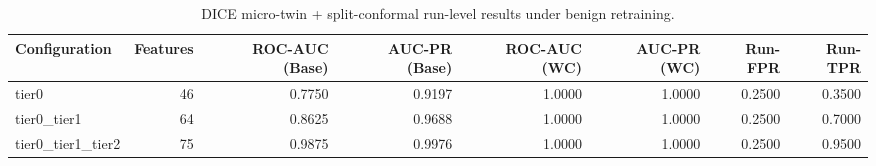 \begin{table}[t]
\centering
\caption{DICE micro-twin + split-conformal run-level results under benign retraining.}
\label{tab:dice_full_overall}
\footnotesize
\begin{tabular}{lrrrrrrr}
\toprule
Configuration & Features & ROC-AUC (Base) & AUC-PR (Base) & ROC-AUC (WC) & AUC-PR (WC) & Run-FPR & Run-TPR \\
\midrule
tier0 & 46 & 0.7750 & 0.9197 & 1.0000 & 1.0000 & 0.2500 & 0.3500 \\
tier0_tier1 & 64 & 0.8625 & 0.9688 & 1.0000 & 1.0000 & 0.2500 & 0.7000 \\
tier0_tier1_tier2 & 75 & 0.9875 & 0.9976 & 1.0000 & 1.0000 & 0.2500 & 0.9500 \\
\bottomrule
\end{tabular}

\end{table}
